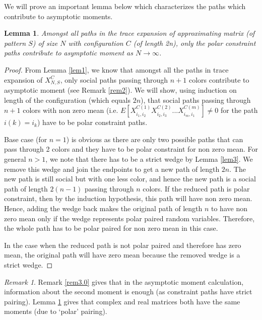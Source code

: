 \documentclass[12pt]{amsart}
\newtheorem{lemma}[thm]{Lemma}
\theoremstyle{definition}
\theoremstyle{remark}
\newtheorem{remark}{Remark}
\begin{document}
We will prove an important lemma below which characterizes the paths which contribute to asymptotic moments. 

\begin{lemma} \label{lem4}
    Amongst all paths in the trace expansion of approximating matrix (of pattern $S$) of size $N$ with configuration $C$ (of length 2n), only the polar constraint paths contribute to asymptotic moment as $N \to \infty$.
\end{lemma}

\begin{proof}
From Lemma \ref{lem1}, we know that amongst all the paths in trace expansion of $X_{N,S}^C$, only social paths passing through $n+1$ colors contribute to asymptotic moment (see Remark \ref{rem2}). We will show, using induction on length of the configuration (which equals $2n$), that social paths passing through $n+1$ colors with non zero mean (i.e. $E[X_{i_1,i_2}^{C(1)}X_{i_2,i_3}^{C(2)}...X_{i_{m},i_{1}}^{C(m)}] \neq 0$ for the path $i(k)=i_k$) have to be polar constraint paths.\par
Base case (for $n=1$) is obvious as there are only two possible paths that can pass through 2 colors and they have to be polar constraint for non zero mean. For general $n>1$, we note that there has to be a strict wedge by Lemma \ref{lem3}. We remove this wedge and join the endpoints to get a new path of length $2n$. The new path is still social but with one less color, and hence the new path is a social path of length $2(n-1)$ passing through $n$ colors. If the reduced path is polar constraint, then by the induction hypothesis, this path will have non zero mean. Hence, adding the wedge back makes the original path of length $n$ to have non zero mean only if the wedge represents polar paired random variables. Therefore, the whole path has to be polar paired for non zero mean in this case. \par
In the case when the reduced path is not polar paired and therefore has zero mean, the original path will have zero mean because the removed wedge is a strict wedge.
\end{proof}




\begin{remark} \label{rem3}
Remark \ref{rem3.0} gives that in the asymptotic moment calculation, information about the second moment is enough (as constraint paths have strict pairing). Lemma \ref{lem4} gives that complex and real matrices both have the same moments (due to `polar' pairing).
\end{remark}
\end{document}
